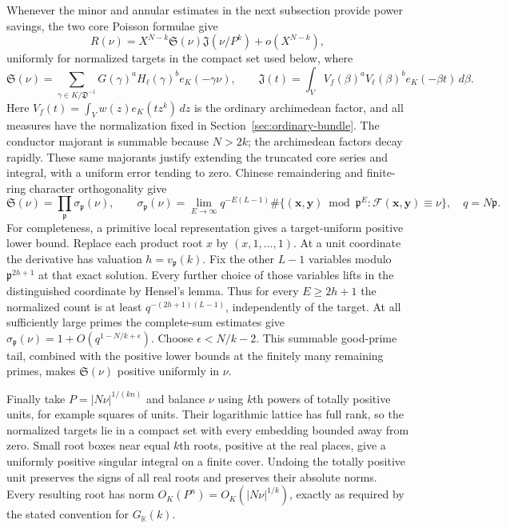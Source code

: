 \documentclass[11pt,reqno]{amsart}
\numberwithin{equation}{section}
\theoremstyle{definition}
\begin{document}
Whenever the minor and annular estimates in the next subsection provide power
savings, the two core Poisson formulae give
\[
 R(\nu)=X^{N-k}\mathfrak S(\nu)\mathfrak J(\nu/P^k)
            +o(X^{N-k}),
\]
uniformly for normalized targets in the compact set used below, where
\[
 \mathfrak S(\nu)=\sum_{\gamma\in K/\mathfrak D^{-1}}
      G(\gamma)^aH_\ell(\gamma)^b e_K(-\gamma\nu),
 \qquad
 \mathfrak J(t)=\int_V V_f(\beta)^aV_\ell(\beta)^b e_K(-\beta t)\,d\beta.
\]
Here $V_f(t)=\int_V w(z)e_K(tz^k)\,dz$ is the ordinary archimedean
factor, and all measures have the normalization fixed in
Section~\ref{sec:ordinary-bundle}.  The conductor majorant is summable
because $N>2k$; the archimedean factors decay rapidly.  These same majorants justify extending the truncated core
series and integral, with a uniform error tending to zero.
Chinese remaindering and finite-ring character orthogonality give
\[
 \mathfrak S(\nu)=\prod_{\mathfrak p}\sigma_{\mathfrak p}(\nu),\qquad
 \sigma_{\mathfrak p}(\nu)=\lim_{E\to\infty}
 q^{-E(L-1)}\#\{(\mathbf x,\mathbf y)\bmod\mathfrak p^E:
                       \mathcal F(\mathbf x,\mathbf y)\equiv\nu\},
 \quad q=N\mathfrak p.
\]
For completeness, a primitive local representation gives a target-uniform
positive lower bound.  Replace each product root $x$ by $(x,1,\ldots,1)$.
At a unit coordinate the derivative has valuation $h=v_{\mathfrak p}(k)$.
Fix the other $L-1$ variables modulo $\mathfrak p^{2h+1}$ at that exact solution.
Every further choice of those variables lifts in the distinguished coordinate
by Hensel's lemma.  Thus for every $E\ge2h+1$ the normalized count is at least
$q^{-(2h+1)(L-1)}$, independently of the target.
At all sufficiently large primes the complete-sum estimates give
$\sigma_{\mathfrak p}(\nu)=1+O(q^{1-N/k+\epsilon})$.
Choose $\epsilon<N/k-2$.  This summable good-prime tail, combined with the
positive lower bounds at the finitely many remaining primes, makes
$\mathfrak S(\nu)$ positive uniformly in $\nu$.

Finally take $P=|N\nu|^{1/(kn)}$ and balance $\nu$ using $k$th powers of
totally positive units, for example squares of units.  Their logarithmic
lattice has full rank, so the normalized targets lie in a compact set with
every embedding bounded away from zero.  Small root boxes near equal $k$th
roots, positive at the real places, give a uniformly positive singular
integral on a finite cover.  Undoing the totally positive unit preserves
the signs of all real roots and preserves their absolute norms.
Every resulting root has norm $O_K(P^n)=O_K(|N\nu|^{1/k})$, exactly as required
by the stated convention for $G_{\mathbb K}(k)$.
\end{document}
